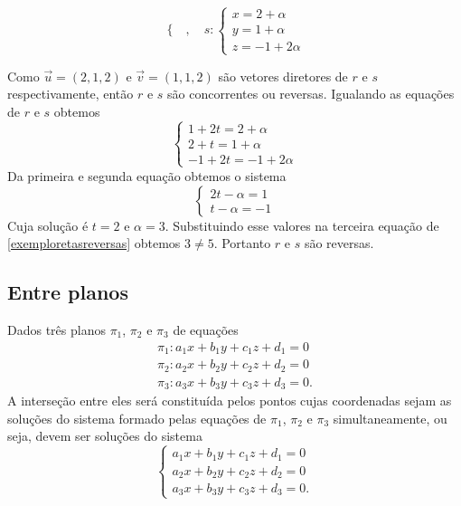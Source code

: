 \begin{exemplos}
\begin{enumerate}
\[\begin{cases}
                  \end{cases},\quad s: \begin{cases}
                      x = 2 + \alpha \\
                      y = 1 + \alpha \\
                      z = -1 + 2\alpha
                  \end{cases}
              \]
              \begin{solucao}
                  Como $\vec{u} = (2,1,2)$ e $\vec{v} = (1,1,2)$ são vetores diretores de $r$ e $s$ respectivamente, então $r$ e $s$ são concorrentes ou reversas. Igualando as equações de $r$ e $s$ obtemos
                  \begin{equation}\label{exemploretasreversas}
                      \begin{cases}
                          1 + 2t = 2 + \alpha \\
                          2 + t = 1 + \alpha  \\
                          -1 + 2t = -1 + 2\alpha
                      \end{cases}
                  \end{equation}
                  Da primeira e segunda equação obtemos o sistema
                  \[
                      \begin{cases}
                          2t - \alpha = 1 \\
                          t - \alpha = -1
                      \end{cases}
                  \]
                  Cuja solução é $t = 2$ e $\alpha = 3$. Substituindo esse valores na terceira equação de \eqref{exemploretasreversas} obtemos $3 \ne 5$. Portanto $r$ e $s$ são reversas.
              \end{solucao}
    \end{enumerate}
\end{exemplos}

\subsection{Entre planos}

Dados três planos $\pi_1$, $\pi_2$ e $\pi_3$ de equações
\begin{align*}
    \pi_1 : a_1x + b_1y + c_1z + d_1 = 0 \\
    \pi_2 : a_2x + b_2y + c_2z + d_2 = 0 \\
    \pi_3 : a_3x + b_3y + c_3z + d_3 = 0.
\end{align*}
A interseção entre eles será constituída pelos pontos cujas coordenadas sejam as soluções do sistema formado pelas equações de $\pi_1$, $\pi_2$ e $\pi_3$ simultaneamente, ou seja, devem ser soluções do sistema
\[
    \begin{cases}
        a_1x + b_1y + c_1z + d_1 = 0 \\
        a_2x + b_2y + c_2z + d_2 = 0 \\
        a_3x + b_3y + c_3z + d_3 = 0.
    \end{cases}
\]

